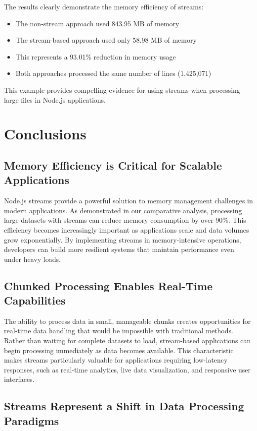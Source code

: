 \documentclass[12pt,letterpaper]{article}
\begin{document}
The results clearly demonstrate the memory efficiency of streams:
\begin{itemize}
    \item The non-stream approach used 843.95 MB of memory
    \item The stream-based approach used only 58.98 MB of memory
    \item This represents a 93.01\% reduction in memory usage
    \item Both approaches processed the same number of lines (1,425,071)
\end{itemize}

This example provides compelling evidence for using streams when processing large files in Node.js applications.

\section{Conclusions}

\subsection{Memory Efficiency is Critical for Scalable Applications}

Node.js streams provide a powerful solution to memory management challenges in modern applications. As demonstrated in our comparative analysis, processing large datasets with streams can reduce memory consumption by over 90\%. This efficiency becomes increasingly important as applications scale and data volumes grow exponentially. By implementing streams in memory-intensive operations, developers can build more resilient systems that maintain performance even under heavy loads.

\subsection{Chunked Processing Enables Real-Time Capabilities}

The ability to process data in small, manageable chunks creates opportunities for real-time data handling that would be impossible with traditional methods. Rather than waiting for complete datasets to load, stream-based applications can begin processing immediately as data becomes available. This characteristic makes streams particularly valuable for applications requiring low-latency responses, such as real-time analytics, live data visualization, and responsive user interfaces.

\subsection{Streams Represent a Shift in Data Processing Paradigms}
\end{document}
